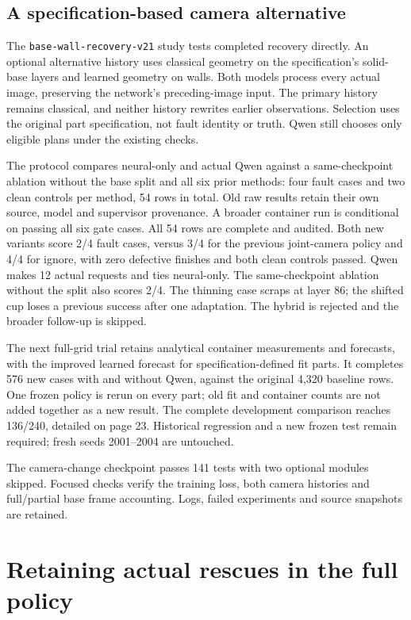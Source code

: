 \documentclass[10pt,letterpaper]{article}
\begin{document}
\subsection*{A specification-based camera alternative}
The \texttt{base-wall-recovery-v21} study tests completed recovery directly.
An optional alternative history uses classical geometry on the specification's
solid-base layers and learned geometry on walls. Both models process every
actual image, preserving the network's preceding-image input. The primary
history remains classical, and neither history rewrites earlier observations.
Selection uses the original part specification, not fault identity or truth.
Qwen still chooses only eligible plans under the existing checks.

The protocol compares neural-only and actual Qwen against a same-checkpoint
ablation without the base split and all six prior methods: four fault cases and
two clean controls per method, 54 rows in total. Old raw results retain their
own source, model and supervisor provenance. A broader container run is
conditional on passing all six gate cases. All 54 rows are complete and audited.
Both new variants score 2/4 fault cases, versus 3/4 for the previous joint-camera
policy and 4/4 for ignore, with zero defective finishes and both clean controls
passed. Qwen makes 12 actual requests and ties neural-only. The same-checkpoint
ablation without the split also scores 2/4. The thinning case scraps at layer 86;
the shifted cup loses a previous success after one adaptation. The hybrid is
rejected and the broader follow-up is skipped.

The next full-grid trial retains analytical container measurements and forecasts,
with the improved learned forecast for specification-defined fit parts. It completes
576 new cases with and without Qwen, against the original 4,320 baseline rows.
One frozen policy is rerun on every part; old fit and container counts are not
added together as a new result. The complete development comparison reaches
136/240, detailed on page 23. Historical regression and a new frozen test remain
required; fresh seeds 2001--2004 are untouched.

The camera-change checkpoint passes 141 tests with two optional modules skipped. Focused
checks verify the training loss, both camera histories and full/partial base
frame accounting. Logs, failed experiments and source snapshots are retained.

\clearpage
\section{Retaining actual rescues in the full policy}
\end{document}
